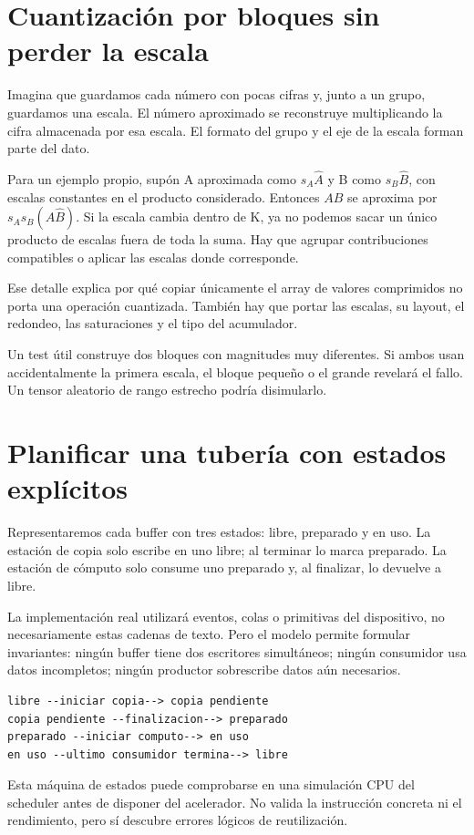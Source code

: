 \documentclass[12pt,a4paper,oneside]{report}
\begin{document}
\section{Cuantización por bloques sin perder la escala}
Imagina que guardamos cada número con pocas cifras y, junto a un grupo, guardamos una escala. El número aproximado se reconstruye multiplicando la cifra almacenada por esa escala. El formato del grupo y el eje de la escala forman parte del dato.

Para un ejemplo propio, supón A aproximada como $s_A\widehat A$ y B como $s_B\widehat B$, con escalas constantes en el producto considerado. Entonces $AB$ se aproxima por $s_As_B(\widehat A\widehat B)$. Si la escala cambia dentro de K, ya no podemos sacar un único producto de escalas fuera de toda la suma. Hay que agrupar contribuciones compatibles o aplicar las escalas donde corresponde.

Ese detalle explica por qué copiar únicamente el array de valores comprimidos no porta una operación cuantizada. También hay que portar las escalas, su layout, el redondeo, las saturaciones y el tipo del acumulador.

Un test útil construye dos bloques con magnitudes muy diferentes. Si ambos usan accidentalmente la primera escala, el bloque pequeño o el grande revelará el fallo. Un tensor aleatorio de rango estrecho podría disimularlo.

\section{Planificar una tubería con estados explícitos}
Representaremos cada buffer con tres estados: libre, preparado y en uso. La estación de copia solo escribe en uno libre; al terminar lo marca preparado. La estación de cómputo solo consume uno preparado y, al finalizar, lo devuelve a libre.

La implementación real utilizará eventos, colas o primitivas del dispositivo, no necesariamente estas cadenas de texto. Pero el modelo permite formular invariantes: ningún buffer tiene dos escritores simultáneos; ningún consumidor usa datos incompletos; ningún productor sobrescribe datos aún necesarios.

\begin{lstlisting}
libre --iniciar copia--> copia pendiente
copia pendiente --finalizacion--> preparado
preparado --iniciar computo--> en uso
en uso --ultimo consumidor termina--> libre
\end{lstlisting}
Esta máquina de estados puede comprobarse en una simulación CPU del scheduler antes de disponer del acelerador. No valida la instrucción concreta ni el rendimiento, pero sí descubre errores lógicos de reutilización.
\end{document}
